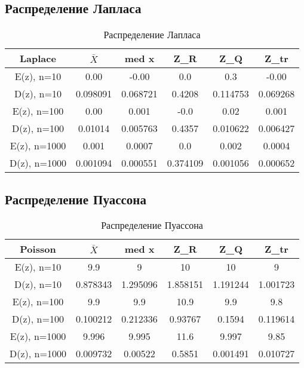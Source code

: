 \subsection{Распределение Лапласа}
\begin{table}[H]
\caption{Распределение Лапласа}
\begin{center}
 \begin{tabular}{||c || c c c c c||} 
 \hline
 Laplace & \(\bar{X}\)  &  med x & Z_{R} & Z_{Q} & Z_{tr} \\ 
 \hline\hline
  E(z), n=10 &  0.00 & -0.00 &  0.0 & 0.3 & -0.00 \\ 
 \hline
  D(z), n=10 & 0.098091 & 0.068721 & 0.4208 & 0.114753 & 0.069268 \\
 \hline
  E(z), n=100 & 0.00 &  0.001 & -0.0 & 0.02 & 0.001 \\
 \hline
  D(z), n=100 & 0.01014  &  0.005763 &   0.4357 & 0.010622 & 0.006427\\
 \hline
   E(z), n=1000 & 0.001 &  0.0007 &  0.0 & 0.002 & 0.0004  \\
 \hline
  D(z), n=1000 & 0.001094 &  0.000551 &  0.374109 & 0.001056 &  0.000652 \\
 \hline
\end{tabular}
\end{center}
\end{table}


\subsection{Распределение Пуассона}
\begin{table}[H]
\caption{Распределение Пуассона}
\begin{center}
 \begin{tabular}{||c || c c c c c||} 
 \hline
 Poisson & \(\bar{X}\)  &  med x & Z_{R} & Z_{Q} & Z_{tr} \\ 
 \hline\hline
  E(z), n=10 &   9.9  &  9   &  10 & 10  &  9 \\ 
 \hline
  D(z), n=10 & 0.878343 &1.295096 & 1.858151 & 1.191244 & 1.001723 \\
 \hline
  E(z), n=100 & 9.9  &  9.9   & 10.9  &   9.9  &  9.8 \\
 \hline
  D(z), n=100 & 0.100212 & 0.212336 & 0.93767  &  0.1594  & 0.119614 \\
 \hline
   E(z), n=1000 & 9.996 &  9.995  &  11.6   &  9.997   & 9.85  \\
 \hline
  D(z), n=1000 & 0.009732 & 0.00522  &  0.5851  & 0.001491 & 0.010727 \\
 \hline
\end{tabular}
\end{center}
\end{table}


